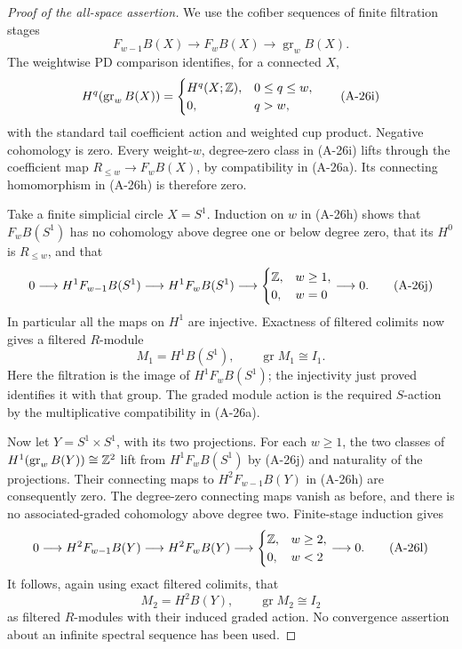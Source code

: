 \begin{proof}[Proof of the all-space assertion]
We use the cofiber sequences of finite filtration stages
\[
 F_{w-1}B(X)\longrightarrow F_wB(X)
                 \longrightarrow \operatorname{gr}_wB(X).
 \tag{A-26h}
\]
The weightwise PD comparison identifies, for a connected \(X\),
\[
 H^q(\operatorname{gr}_wB(X))=
 \begin{cases}H^q(X;\mathbb Z),&0\le q\le w,\\
 0,&q>w,\end{cases}
 \tag{A-26i}
\]
with the standard tail coefficient action and weighted cup
product. Negative cohomology is zero.
Every weight-\(w\), degree-zero class in (A-26i) lifts through
the coefficient map \(R_{\le w}\to F_wB(X)\), by compatibility
in (A-26a). Its connecting homomorphism in (A-26h) is
therefore zero.

Take a finite simplicial circle \(X=S^1\). Induction on \(w\)
in (A-26h) shows that \(F_wB(S^1)\) has no cohomology above
degree one or below degree zero, that its \(H^0\) is
\(R_{\le w}\), and that
\[
 0\longrightarrow H^1F_{w-1}B(S^1)
  \longrightarrow H^1F_wB(S^1)
  \longrightarrow
  \begin{cases}\mathbb Z,&w\ge1,\\0,&w=0\end{cases}
  \longrightarrow0.
 \tag{A-26j}
\]
In particular all the maps on \(H^1\) are injective.
Exactness of filtered colimits now gives a filtered \(R\)-module
\[
 M_1=H^1B(S^1),\qquad \operatorname{gr}M_1\cong I_1.
 \tag{A-26k}
\]
Here the filtration is the image of \(H^1F_wB(S^1)\);
the injectivity just proved identifies it with that group.
The graded module action is the required \(S\)-action by
the multiplicative compatibility in (A-26a).

Now let \(Y=S^1\times S^1\), with its two projections.
For each \(w\ge1\), the two classes of
\(H^1(\operatorname{gr}_wB(Y))\cong\mathbb Z^2\) lift from
\(H^1F_wB(S^1)\) by (A-26j) and naturality of the projections.
Their connecting maps to \(H^2F_{w-1}B(Y)\) in (A-26h)
are consequently zero. The degree-zero connecting maps
vanish as before, and there is no associated-graded cohomology
above degree two. Finite-stage induction gives
\[
 0\longrightarrow H^2F_{w-1}B(Y)
  \longrightarrow H^2F_wB(Y)
  \longrightarrow
  \begin{cases}\mathbb Z,&w\ge2,\\0,&w<2\end{cases}
  \longrightarrow0.
 \tag{A-26l}
\]
It follows, again using exact filtered colimits, that
\[
 M_2=H^2B(Y),\qquad \operatorname{gr}M_2\cong I_2
\]
as filtered \(R\)-modules with their induced graded action.
No convergence assertion about an infinite spectral sequence
has been used.


\end{proof}
